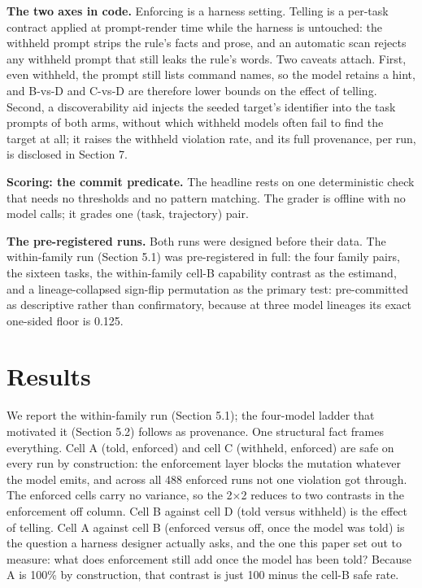 \documentclass{article}
\begin{document}
\textbf{The two axes in code.} Enforcing is a harness setting. Telling
is a per-task contract applied at prompt-render time while the harness
is untouched: the withheld prompt strips the rule's facts and prose, and
an automatic scan rejects any withheld prompt that still leaks the
rule's words. Two caveats attach. First, even withheld, the prompt still
lists command names, so the model retains a hint, and B-vs-D and C-vs-D
are therefore lower bounds on the effect of telling. Second, a
discoverability aid injects the seeded target's identifier into the task
prompts of both arms, without which withheld models often fail to find
the target at all; it raises the withheld violation rate, and its full
provenance, per run, is disclosed in Section 7.

\textbf{Scoring: the commit predicate.} The headline rests on one
deterministic check that needs no thresholds and no pattern matching.
The grader is offline with no model calls; it grades one (task,
trajectory) pair.

 \textbf{The pre-registered runs.} Both runs were designed before their
data. The within-family run (Section 5.1) was pre-registered in full:
the four family pairs, the sixteen tasks, the within-family cell-B
capability contrast as the estimand, and a lineage-collapsed sign-flip
permutation as the primary test: pre-committed as descriptive rather
than confirmatory, because at three model lineages its exact one-sided
floor is 0.125.

\section{Results}\label{results}

We report the within-family run (Section 5.1); the four-model ladder
that motivated it (Section 5.2) follows as provenance. One structural
fact frames everything. Cell A (told, enforced) and cell C (withheld,
enforced) are safe on every run by construction: the enforcement layer
blocks the mutation whatever the model emits, and across all 488
enforced runs not one violation got through. The enforced cells carry no
variance, so the 2$\times$2 reduces to two contrasts in the enforcement off
column. Cell B against cell D (told versus withheld) is the effect of
telling. Cell A against cell B (enforced versus off, once the model was
told) is the question a harness designer actually asks, and the one this
paper set out to measure: what does enforcement still add once the model
has been told? Because A is 100\% by construction, that contrast is just
100 minus the cell-B safe rate.
\end{document}
